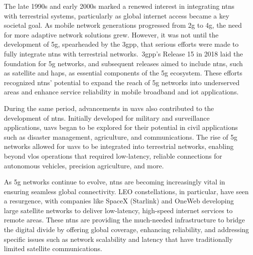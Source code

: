 The late 1990s and early 2000s marked a renewed interest in integrating \glspl{ntn} with terrestrial systems, particularly as global internet access became a key societal goal. As mobile network generations progressed from \gls{2g} to \gls{4g}, the need for more adaptive network solutions grew. However, it was not until the development of \gls{5g}, spearheaded by the \gls{3gpp}, that serious efforts were made to fully integrate \glspl{ntn} with terrestrial networks.\ \gls{3gpp}'s Release 15 \autocite{3gpp_rel15} in 2018 laid the foundation for \gls{5g} networks, and subsequent releases aimed to include \glspl{ntn}, such as satellite and \glspl{hap}, as essential components of the \gls{5g} ecosystem. These efforts recognized \glspl{ntn}' potential to expand the reach of \gls{5g} networks into underserved areas and enhance service reliability in mobile broadband and \gls{iot} applications.

During the same period, advancements in \glspl{uav} also contributed to the development of \glspl{ntn}. Initially developed for military and surveillance applications, \glspl{uav} began to be explored for their potential in civil applications such as disaster management, agriculture, and communications. The rise of \gls{5g} networks allowed for \glspl{uav} to be integrated into terrestrial networks, enabling beyond \gls{vlos} operations that required low-latency, reliable connections for autonomous vehicles, precision agriculture, and more.

As \gls{5g} networks continue to evolve, \glspl{ntn} are becoming increasingly vital in ensuring seamless global connectivity. LEO constellations, in particular, have seen a resurgence, with companies like SpaceX (Starlink) \autocite{tao2022impact} and OneWeb \autocite{zhu2022laser} developing large satellite networks to deliver low-latency, high-speed internet services to remote areas. These \glspl{ntn} are providing the much-needed infrastructure to bridge the digital divide by offering global coverage, enhancing reliability, and addressing specific issues such as network scalability and latency that have traditionally limited satellite communications.

